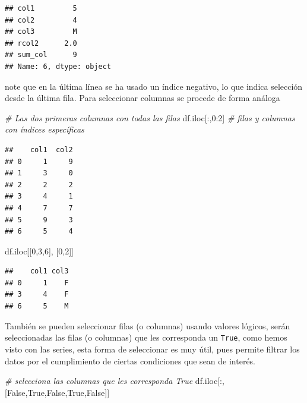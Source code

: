 \documentclass[
]{book}
\newenvironment{Shaded}{\begin{snugshade}}{\end{snugshade}}
\newcommand{\CommentTok}[1]{\textcolor[rgb]{0.56,0.35,0.01}{\textit{#1}}}
\newcommand{\DecValTok}[1]{\textcolor[rgb]{0.00,0.00,0.81}{#1}}
\newcommand{\NormalTok}[1]{#1}
\newcommand{\VariableTok}[1]{\textcolor[rgb]{0.00,0.00,0.00}{#1}}
\theoremstyle{definition}
\theoremstyle{definition}
\theoremstyle{definition}
\theoremstyle{definition}
\theoremstyle{remark}
\begin{document}
\begin{verbatim}
## col1         5
## col2         4
## col3         M
## rcol2      2.0
## sum_col      9
## Name: 6, dtype: object
\end{verbatim}

note que en la última línea se ha usado un índice negativo, lo que indica selección desde la última fila. Para seleccionar columnas se procede de forma análoga

\begin{Shaded}
\begin{Highlighting}[]
\CommentTok{\# Las dos primeras columnas con todas las filas }
\NormalTok{df.iloc[:,}\DecValTok{0}\NormalTok{:}\DecValTok{2}\NormalTok{]}
\CommentTok{\# filas y columnas con  índices específicas }
\end{Highlighting}
\end{Shaded}

\begin{verbatim}
##    col1  col2
## 0     1     9
## 1     3     0
## 2     2     2
## 3     4     1
## 4     7     7
## 5     9     3
## 6     5     4
\end{verbatim}

\begin{Shaded}
\begin{Highlighting}[]
\NormalTok{df.iloc[[}\DecValTok{0}\NormalTok{,}\DecValTok{3}\NormalTok{,}\DecValTok{6}\NormalTok{], [}\DecValTok{0}\NormalTok{,}\DecValTok{2}\NormalTok{]] }
\end{Highlighting}
\end{Shaded}

\begin{verbatim}
##    col1 col3
## 0     1    F
## 3     4    F
## 6     5    M
\end{verbatim}

También se pueden seleccionar filas (o columnas) usando valores lógicos, serán seleccionadas las filas (o columnas) que les corresponda un \texttt{True}, como hemos visto con las series, esta forma de seleccionar es muy útil, pues permite filtrar los datos por el cumplimiento de ciertas condiciones que sean de interés.

\begin{Shaded}
\begin{Highlighting}[]
\CommentTok{\# selecciona las columnas que les corresponda True}
\NormalTok{df.iloc[:,[}\VariableTok{False}\NormalTok{,}\VariableTok{True}\NormalTok{,}\VariableTok{False}\NormalTok{,}\VariableTok{True}\NormalTok{,}\VariableTok{False}\NormalTok{]]}
\end{Highlighting}
\end{Shaded}
\end{document}
